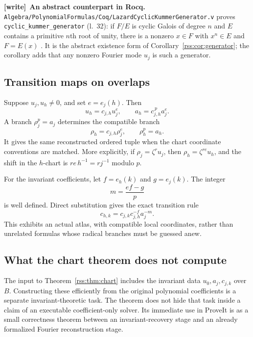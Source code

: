 \documentclass[11pt,a4paper]{article}
\theoremstyle{definition}
\theoremstyle{remark}
\newcommand{\code}[1]{{\small\nolinkurl{#1}}}
\newenvironment{writenote}[1][]{\par\smallskip\begingroup\small
 \noindent\textbf{[write]}\if\relax\detokenize{#1}\relax\else~\textbf{#1.}\fi\ }%
 {\par\endgroup\smallskip}
\newcommand{\repo}[1]{\code{#1}}
\begin{document}
\begin{writenote}[An abstract counterpart in Rocq]
\repo{Algebra/PolynomialFormulas/Coq/LazardCyclicKummerGenerator.v} proves
\code{cyclic_kummer_generator} (l.~32): if $F/E$ is cyclic Galois of degree
$n$ and $E$ contains a primitive $n$th root of unity, there is a nonzero
$x\in F$ with $x^n\in E$ and $F=E(x)$ \cite{repoKummer}. It is the abstract
existence form of Corollary~\ref{rss:cor:generator}; the corollary adds that
any nonzero Fourier mode $u_j$ is such a generator.
\end{writenote}

\subsection{Transition maps on overlaps}

Suppose $u_j,u_h\neq0$, and set $e=e_j(h)$. Then
\[
 u_h=c_{j,h}u_j^e,\qquad
 a_h=c_{j,h}^{\,p}a_j^e.
\]
A branch $\rho_j^p=a_j$ determines the compatible branch
\begin{equation}
 \rho_h=c_{j,h}\rho_j^e,
 \qquad \rho_h^p=a_h.
 \label{rss:eq:transition}
\end{equation}
It gives the same reconstructed ordered tuple when the chart coordinate
conventions are matched. More explicitly, if
$\rho_j=\zeta^r u_j$, then
$\rho_h=\zeta^{re}u_h$, and the shift in the $h$-chart is
$re\,h^{-1}=rj^{-1}$ modulo $p$.

For the invariant coefficients, let $f=e_h(k)$ and $g=e_j(k)$. The integer
\[
 m=\frac{ef-g}{p}
\]
is well defined. Direct substitution gives the exact transition rule
\begin{equation}
 c_{h,k}=c_{j,k}c_{j,h}^{-f}a_j^{-m}.
 \label{rss:eq:transitioncoeff}
\end{equation}
This exhibits an actual atlas, with compatible local coordinates, rather
than unrelated formulas whose radical branches must be guessed anew.

\subsection{What the chart theorem does not compute}

The input to Theorem~\ref{rss:thm:chart} includes the invariant data
$u_0,a_j,c_{j,k}$ over $B$. Constructing these efficiently from the original
polynomial coefficients is a separate invariant-theoretic task. The theorem
does not hide that task inside a claim of an executable coefficient-only
solver. Its immediate use in ProveIt is as a small correctness theorem
between an invariant-recovery stage and an already formalized Fourier
reconstruction stage.
\end{document}
